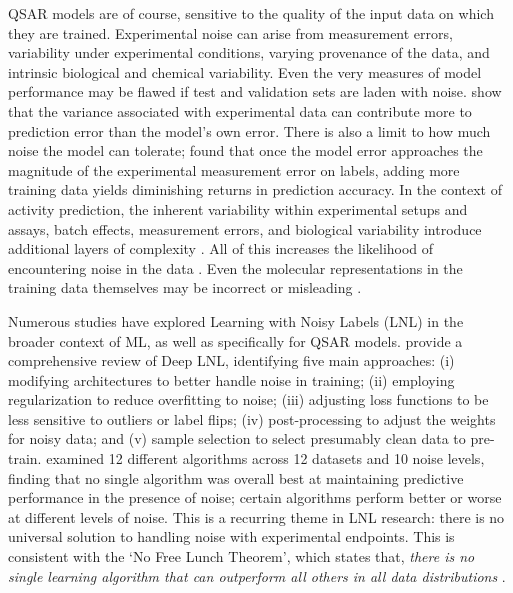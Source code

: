 \documentclass[pdflatex,sn-basic]{sn-jnl}%
\theoremstyle{thmstyleone}%
\theoremstyle{thmstyletwo}%
\theoremstyle{thmstylethree}%
\begin{document}
QSAR models are of course, sensitive to the quality of the input data on which they are trained. Experimental noise can arise from measurement errors, variability under experimental conditions, varying provenance of the data, and intrinsic biological and chemical variability. Even the very measures of model performance may be flawed if test and validation sets are laden with noise. \citet{Kolmar2021} show that the variance associated with experimental data can contribute more to prediction error than the model’s own error. There is also a limit to how much noise the model can tolerate; \citet{jorner2021} found that once the model error approaches the magnitude of the experimental measurement error on labels, adding more training data yields diminishing returns in prediction accuracy. In the context of activity prediction, the inherent variability within experimental setups and assays, batch effects, measurement errors, and biological variability introduce additional layers of complexity \citep{Kolmar2021, Fourches2010}. All of this increases the likelihood of encountering noise in the data \citep{Fang2022}. Even the molecular representations in the training data themselves may be incorrect or misleading \citep{Walters2023}. 

Numerous studies have explored Learning with Noisy Labels (LNL) in the broader context of ML, as well as specifically for QSAR models. \citet{Song2022} provide a comprehensive review of Deep LNL, identifying five main approaches: (i) modifying architectures to better handle noise in training; (ii) employing regularization to reduce overfitting to noise; (iii) adjusting loss functions to be less sensitive to outliers or label flips; (iv) post-processing to adjust the weights for noisy data; and (v) sample selection to select presumably clean data to pre-train. \citet{Cortes2015} examined 12 different algorithms across 12 datasets and 10 noise levels, finding that no single algorithm was overall best at maintaining predictive performance in the presence of noise; certain algorithms perform better or worse at different levels of noise. This is a recurring theme in LNL research: there is no universal solution to handling noise with experimental endpoints. This is consistent with the `No Free Lunch Theorem', which states that, \emph{there is no single learning algorithm that can outperform all others in all data distributions} \citep{Wolpert1997}. 
\end{document}
